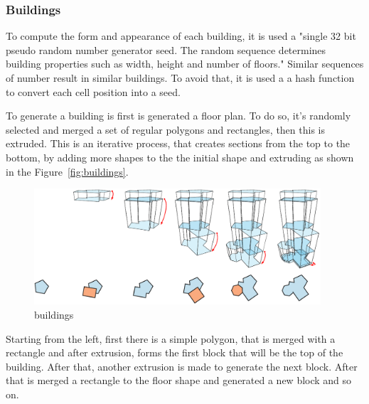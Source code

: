 
\subsubsection{Buildings} %
\label{ssub:buildings}


To compute the form and appearance of each building, it is used a "single 32 bit pseudo random number generator seed. The random sequence determines building properties such as width, height and number of floors."
Similar sequences of number result in similar buildings. To avoid that, it is used a a hash function to convert each cell position into a seed.

To generate a building is first is generated a floor plan. To do so, it's randomly selected and merged a set of regular polygons and rectangles, then this is extruded. This is an iterative process, that creates sections from the top to the bottom, by adding more shapes to the the initial shape and extruding as shown in the Figure~\ref{fig:buildings}.

\begin{figure}[htbp]
	\centering
	\includegraphics[width=0.95\textwidth]{img/Real-Time-procedural-generation/Building-Generation.png}
	\caption{buildings}
	\label{fig:label}
\end{figure}


Starting from the left, first there is a simple polygon, that is merged with a rectangle and after extrusion, forms the first block that will be the top of the building. After that, another extrusion is made to generate the next block. After that is merged a rectangle to the floor shape and generated a new block and so on.


